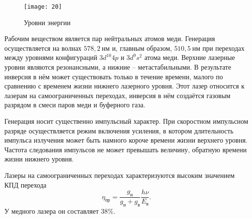 \begin{figure}[h]
    \center
    \texttt{[image: 20]}
    \caption{Уровни энергии}
\end{figure}
Рабочим веществом является пар нейтральных атомов меди. Генерация 
осуществляется на волнах \( 578,2~\text{нм} \) и, главным образом, 
\( 510,5~\text{нм} \) при переходах между уровнями конфигураций 
\( 3d^{10}4p \) и \( 3d^9s^2 \) атома меди. Верхние лазерные уровни 
 являются резонансными, а нижние  -- 
метастабильными. В результате инверсия в нём может существовать только в 
течение времени, малого по сравнению с временем жизни нижнего лазерного 
уровня. Этот лазер относится к лазерам на самоограниченных переходах, инверсия 
в нём создаётся газовым разрядом в смеси паров меди и буферного газа.

Генерация носит существенно импульсный характер. При скоростном импульсном 
разряде осуществляется режим включения усиления, в котором длительность 
импульса излучения может быть намного короче времени жизни верхнего уровня. 
Частота следования импульсов не может превышать величину, обратную времени 
жизни нижнего уровня.

Лазеры на самоограниченных переходах характеризуются высоким значением КПД 
перехода
\[
	\eta_\text{пр} =
    	\frac{g_\text{н}}{g_\text{н}+g_\text{в}}\frac{h\nu}{E_\text{в}}.
\]
У медного лазера он составляет 38\%.